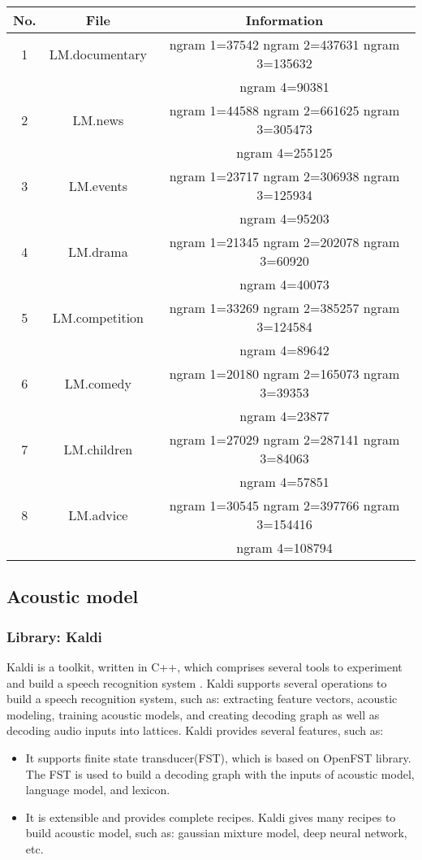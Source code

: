 \begin{enumerate}
\begin{center}
\begin{tabular}{ | c | c | c | }
\hline
\textbf{No.} & \textbf{File}  & \textbf{Information} \\ \hline \hline
1 & LM.documentary & ngram 1=37542
ngram 2=437631
ngram 3=135632 \\
& & ngram 4=90381   \\ \hline
2 & LM.news & ngram 1=44588
ngram 2=661625
ngram 3=305473 \\
& & ngram 4=255125  \\ \hline
3 & LM.events & ngram 1=23717
ngram 2=306938
ngram 3=125934 \\
& & ngram 4=95203  \\ \hline
4 & LM.drama & ngram 1=21345
ngram 2=202078
ngram 3=60920 \\
& & ngram 4=40073  \\ \hline
5 & LM.competition &  ngram 1=33269
ngram 2=385257
ngram 3=124584 \\
& & ngram 4=89642 \\ \hline
6 & LM.comedy & ngram 1=20180
ngram 2=165073
ngram 3=39353 \\
& & ngram 4=23877  \\ \hline
7 & LM.children &  ngram 1=27029
ngram 2=287141
ngram 3=84063 \\
& & ngram 4=57851 \\ \hline
8 & LM.advice & ngram 1=30545
ngram 2=397766
ngram 3=154416 \\
& & ngram 4=108794  \\ \hline
\end{tabular}
\end{center}

\end{enumerate}




\subsection{Acoustic model}
\subsubsection{Library: Kaldi}
Kaldi is a toolkit, written in C++, which comprises several tools to experiment and build a speech recognition system \cite{PoveyASRU2011}. Kaldi supports several operations to build a speech recognition system, such as: extracting feature vectors, acoustic modeling, training acoustic models, and creating decoding graph as well as decoding audio inputs into lattices. Kaldi provides several features, such as:
\begin{itemize}
\item It supports finite state transducer(FST), which is based on OpenFST library. The FST is used to build a decoding graph with the inputs of acoustic model, language model, and lexicon.
\item It is extensible and provides complete recipes. Kaldi gives many recipes to build acoustic model, such as: gaussian mixture model, deep neural network, etc.
\end{itemize}

